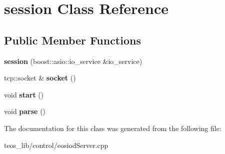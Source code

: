 \hypertarget{classsession}{}\section{session Class Reference}
\label{classsession}
\subsection*{Public Member Functions}
\begin{DoxyCompactItemize}
\item 
\mbox{\label{classsession_ae8ec671941d1b8c7ac1b54978692cc85}} 
{\bfseries session} (boost\+::asio\+::io\+\_\+service \&io\+\_\+service)
\item 
\mbox{\label{classsession_a877765bc7124ada6580ad2f748b4d72c}} 
tcp\+::socket \& {\bfseries socket} ()
\item 
\mbox{\label{classsession_ad69144e27f558b8960efae132f2e15f4}} 
void {\bfseries start} ()
\item 
\mbox{\label{classsession_a07999ceff60bc59bab2d4b53e0c4cc9a}} 
void {\bfseries parse} ()
\end{DoxyCompactItemize}


The documentation for this class was generated from the following file\+:\begin{DoxyCompactItemize}
\item 
teos\+\_\+lib/control/eosiod\+Server.\+cpp\end{DoxyCompactItemize}
